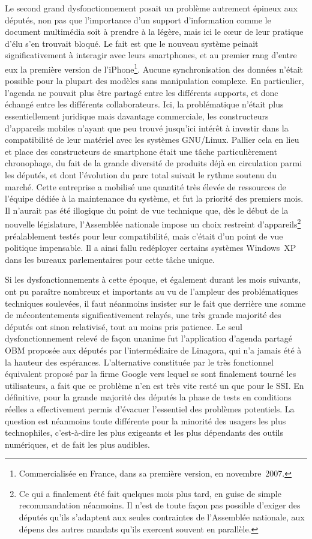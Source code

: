 \documentclass{FramateX}
\begin{document}
\begin{refsection}
Le second grand dysfonctionnement posait un problème autrement épineux
aux députés, non pas que l'importance d'un support d'information comme
le document multimédia soit à prendre à la légère, mais ici le cœur de
leur pratique d'élu s'en trouvait bloqué. Le fait est que le nouveau
système peinait significativement à interagir avec leurs smartphones,
et au premier rang d'entre eux la première version de
l'iPhone\footnote{Commercialisée en France, dans sa première version,
en novembre~2007.}. Aucune synchronisation des données n'était possible
pour la plupart des modèles sans manipulation complexe. En particulier,
l'agenda ne pouvait plus être partagé entre les différents supports, et
donc échangé entre les différents collaborateurs. Ici, la problématique
n'était plus essentiellement juridique mais davantage commerciale, les
constructeurs d'appareils mobiles n'ayant que peu trouvé jusqu'ici
intérêt à investir dans la compatibilité de leur matériel avec les
systèmes GNU/Linux. Pallier cela en lieu et place des constructeurs de
smartphone était une tâche particulièrement chronophage, du fait de la
grande diversité de produits déjà en circulation parmi les députés, et
dont l'évolution du parc total suivait le rythme soutenu du marché.
Cette entreprise a mobilisé une quantité très élevée de ressources de
l'équipe dédiée à la maintenance du système, et fut la priorité des
premiers mois. Il n'aurait pas été illogique du point de vue technique
que, dès le début de la nouvelle législature, l'Assemblée nationale
impose un choix restreint d'appareils\footnote{Ce qui a finalement été
fait quelques mois plus tard, en guise de simple recommandation
néanmoins. Il n'est de toute façon pas possible d'exiger des députés
qu'ils s'adaptent aux seules contraintes de l'Assemblée nationale, aux
dépens des autres mandats qu'ils exercent souvent en parallèle. }
préalablement testés pour leur compatibilité, mais c'était d'un point
de vue politique impensable. Il a ainsi fallu redéployer certains
systèmes Windows~XP dans les bureaux parlementaires pour cette tâche
unique. 

Si les dysfonctionnements à cette époque, et également durant les mois
suivants, ont pu paraître nombreux et importants au vu de l'ampleur des
problématiques techniques soulevées, il faut néanmoins insister sur le
fait que derrière une somme de mécontentements significativement
relayés, une très grande majorité des députés ont sinon relativisé,
tout au moins pris patience. Le seul dysfonctionnement relevé de façon
unanime fut l'application d'agenda partagé OBM proposée aux députés par
l'intermédiaire de Linagora, qui n'a jamais été à la hauteur des
espérances. L'alternative constituée par le très fonctionnel équivalent
proposé par la firme Google vers lequel se sont finalement tourné les
utilisateurs, a fait que ce problème n'en est très vite resté un que
pour le SSI. En définitive, pour la grande majorité des députés la
phase de tests en conditions réelles a effectivement permis d'évacuer
l'essentiel des problèmes potentiels. La question est néanmoins toute
différente pour la minorité des usagers les plus technophiles,
c'est-à-dire les plus exigeants et les plus dépendants des outils
numériques, et de fait les plus audibles.


\end{refsection}
\end{document}
